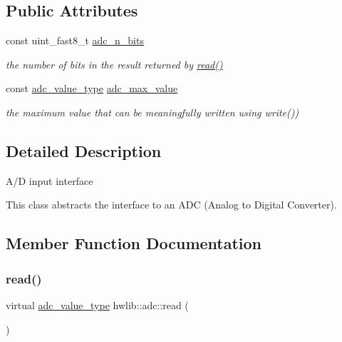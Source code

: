 \subsection*{Public Attributes}
\begin{DoxyCompactItemize}
\item 
\mbox{\label{classhwlib_1_1adc_a94a0df22c46f1958f7351585bbc073ea}} 
const uint\+\_\+fast8\+\_\+t \hyperlink{classhwlib_1_1adc_a94a0df22c46f1958f7351585bbc073ea}{adc\+\_\+n\+\_\+bits}
\begin{DoxyCompactList}\small\item\em the number of bits in the result returned by \hyperlink{classhwlib_1_1adc_ac39b506d3ae4eec08caa5aa7e69ab2fb}{read()} \end{DoxyCompactList}\item 
\mbox{\label{classhwlib_1_1adc_a588267c5f52797ff87e65df0875c2ff1}} 
const \hyperlink{classhwlib_1_1adc_a1faacac0cc2f78e90652b17250cbe159}{adc\+\_\+value\+\_\+type} \hyperlink{classhwlib_1_1adc_a588267c5f52797ff87e65df0875c2ff1}{adc\+\_\+max\+\_\+value}
\begin{DoxyCompactList}\small\item\em the maximum value that can be meaningfully written using write()) \end{DoxyCompactList}\end{DoxyCompactItemize}


\subsection{Detailed Description}
A/D input interface

This class abstracts the interface to an A\+DC (Analog to Digital Converter). 

\subsection{Member Function Documentation}
\mbox{\label{classhwlib_1_1adc_ac39b506d3ae4eec08caa5aa7e69ab2fb}} 
\subsubsection{\texorpdfstring{read()}{read()}}
{\footnotesize\ttfamily virtual \hyperlink{classhwlib_1_1adc_a1faacac0cc2f78e90652b17250cbe159}{adc\+\_\+value\+\_\+type} hwlib\+::adc\+::read (\begin{DoxyParamCaption}{ }\end{DoxyParamCaption})\hspace{0.3cm}{\ttfamily [pure virtual]}}

